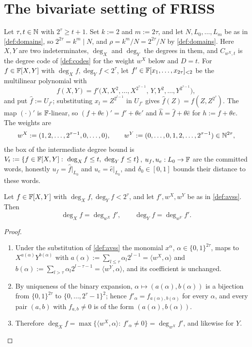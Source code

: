 \section{The bivariate setting of {FRISS}}

\begin{definition}\label{def:avss}
Let $\tau,t\in\mathbb{N}$ with $2^\tau\ge t+1$. Set $k:=2$ and $m:=2\tau$, and let $N,L_0,\dots,L_m$ be
as in \cref{def:domains}, so $2^{2\tau}=k^m\mid N$, and $\rho=k^m/N=2^{2\tau}/N$ by
\cref{def:domains}. Here $X,Y$ are two
indeterminates, $\deg_X$ and $\deg_Y$ the degrees in them, and $C_{w^X,t}$ is the degree code of
\cref{def:codes} for the weight $w^X$ below and $D=t$. For
$f\in\mathbb{F}[X,Y]$ with $\deg_Xf,\deg_Yf<2^\tau$, let $f'\in\mathbb{F}[x_1,\dots,x_{2\tau}]_{<2}$ be the
multilinear polynomial with
\[
f(X,Y)=f'\big(X,X^2,\dots,X^{2^{\tau-1}},\,Y,Y^2,\dots,Y^{2^{\tau-1}}\big),
\]
and put $\hat f:=U_{f'}$; substituting $x_l=Z^{2^{l-1}}$ in $U_{f'}$ gives
$\hat f(Z)=f(Z,Z^{2^\tau})$. The map $(\cdot)'$ is $\mathbb{F}$-linear, so $(f+\theta e)'=f'+\theta e'$ and
$\hat h=\hat f+\theta\hat e$ for $h:=f+\theta e$. The weights are
\[
w^X:=(1,2,\dots,2^{\tau-1},0,\dots,0),\qquad
w^Y:=(0,\dots,0,1,2,\dots,2^{\tau-1})\in\mathbb{N}^{2\tau},
\]
the box of the intermediate degree bound is $V_t:=\{f\in\mathbb{F}[X,Y]:\ \deg_Xf\le t,\ \deg_Yf\le t\}$,
$u_f,u_e:L_0\to\mathbb{F}$ are the committed words, honestly $u_f=\hat f|_{L_0}$ and
$u_e=\hat e|_{L_0}$, and $\delta_0\in[0,1]$ bounds their distance to these words.
\end{definition}

\begin{lemma}\label{lem:avss-bits}
Let $f\in\mathbb{F}[X,Y]$ with $\deg_Xf,\deg_Yf<2^\tau$, and let $f',w^X,w^Y$ be as in
\cref{def:avss}. Then
\[
\deg_Xf=\deg_{w^X}f',\qquad \deg_Yf=\deg_{w^Y}f'.
\]
\end{lemma}

\begin{proof}\begin{enumerate}
\item Under the substitution of \cref{def:avss} the monomial $x^\alpha$,
$\alpha\in\{0,1\}^{2\tau}$, maps to $X^{a(\alpha)}Y^{b(\alpha)}$ with
$a(\alpha):=\sum_{l\le\tau}\alpha_l2^{l-1}=\langle w^X,\alpha\rangle$ and
$b(\alpha):=\sum_{l>\tau}\alpha_l2^{l-\tau-1}=\langle w^Y,\alpha\rangle$, and its coefficient
is unchanged.
\item By uniqueness of the binary expansion, $\alpha\mapsto(a(\alpha),b(\alpha))$ is a bijection
from $\{0,1\}^{2\tau}$ to $\{0,\dots,2^\tau-1\}^2$; hence $f'_\alpha=f_{a(\alpha),b(\alpha)}$ for every
$\alpha$, and every pair $(a,b)$ with $f_{a,b}\ne0$ is of the form $(a(\alpha),b(\alpha))$.
\item Therefore $\deg_Xf=\max\{\langle w^X,\alpha\rangle:\ f'_\alpha\ne0\}=\deg_{w^X}f'$, and
likewise for $Y$.
\end{enumerate}\end{proof}

